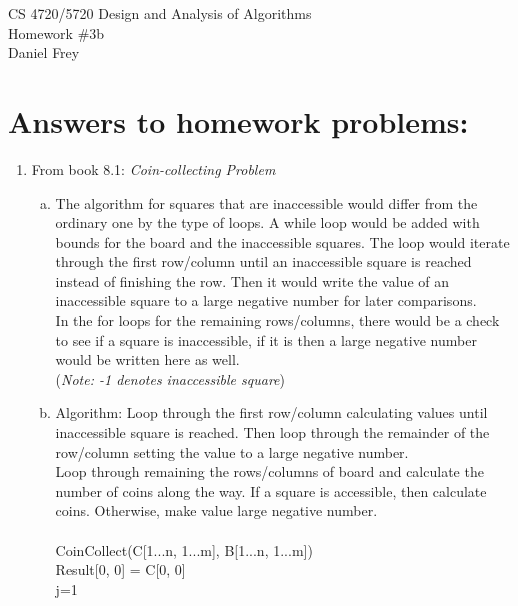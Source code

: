 \documentclass[11pt]{article}
\begin{document}
 

\rhead{\today}

\begin{center}
\begin{Large}
	CS 4720/5720 Design and Analysis of Algorithms \\
	Homework \#3b \\
	Daniel Frey
\end{Large}
\end{center}

\section*{Answers to homework problems:}

\begin{enumerate}
	\item
		From book 8.1: \textit{Coin-collecting Problem}

		\begin{enumerate}[(a)]
			\item
				\hspace*{.5cm}
				The algorithm for squares that are inaccessible would differ from the ordinary one by the type of loops. A while loop would be added with bounds for the board and the inaccessible squares. The loop would iterate through the first row/column until an inaccessible square is reached instead of finishing the row. Then it would write the value of an inaccessible square to a large negative number for later comparisons. \\
				\hspace*{.5cm}
				In the for loops for the remaining rows/columns, there would be a check to see if a square is inaccessible, if it is then a large negative number would be written here as well. \\
				(\textit{Note: -1 denotes inaccessible square}) \\
			\item
			Algorithm: 
				\hspace{.5cm} 
				Loop through the first row/column calculating values until inaccessible square is reached. Then loop through the remainder of the row/column setting the value to a large negative number. \\
				\hspace*{.5cm}
				Loop through remaining the rows/columns of  board and calculate the number of coins along the way. If a square is accessible, then calculate coins. Otherwise, make value large negative number. \\\\
				CoinCollect(C[1...n, 1...m], B[1...n, 1...m]) \\
					\hspace*{.5cm}
					Result[0, 0] = C[0, 0] \\
					\hspace*{.5cm}
					j=1 \\


\end{enumerate}
\end{enumerate}
\end{document}
